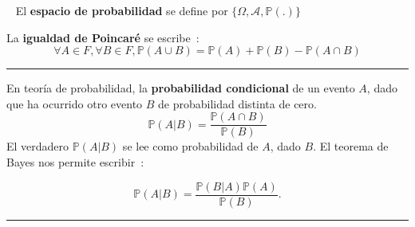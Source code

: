 \begin{f}[Axiomas]{\ }
	El \textbf{espacio de probabilidad} se define por
	\( \lbrace \Omega, \mathcal{A}, \mathbb{P}(.) \rbrace \)
	
	La \textbf{igualdad de Poincaré} se escribe~:
	\[\forall A \in F, \forall B \in F, \mathbb{P} (A \cup B) = \mathbb{P} (A) + \mathbb{P} (B) - \mathbb{P} (A \cap B)\]
	
\end{f}
\hrule

\begin{f}[Bayes]
	En teoría de probabilidad, la \textbf{probabilidad condicional} de un evento \(A\), dado que ha ocurrido otro evento \(B\) de probabilidad distinta de cero.
	\[
	\mathbb{P}(A|B) = \frac{\mathbb{P}(A \cap B)}{\mathbb{P}(B)}
	\]
	El verdadero \(\mathbb{P}(A|B)\) se lee como probabilidad de \(A\), dado \(B\).
	El teorema de Bayes nos permite escribir~:
	
	\[   \mathbb{P}(A|B) = \frac{\mathbb{P}(B|A)\mathbb{P}(A)}{\mathbb{P}(B)}. \]
\end{f}
\hrule


